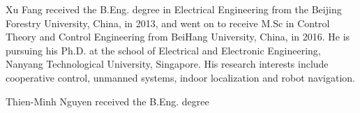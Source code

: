 \documentclass[journal]{IEEEtran}
\begin{document}
\begin{IEEEbiography}{Xu Fang}
	received the B.Eng. degree in Electrical Engineering from the Beijing Forestry University, China, in 2013, and went on to receive M.Sc in Control Theory and Control Engineering from BeiHang University, China, in 2016. He is pursuing his Ph.D. at the school of Electrical and Electronic Engineering, Nanyang Technological University, Singapore. His research interests include cooperative control, unmanned systems, indoor localization and robot navigation.
\end{IEEEbiography}

\begin{IEEEbiography}{Thien-Minh Nguyen}
	received the B.Eng. degree
\end{IEEEbiography}
\end{document}

